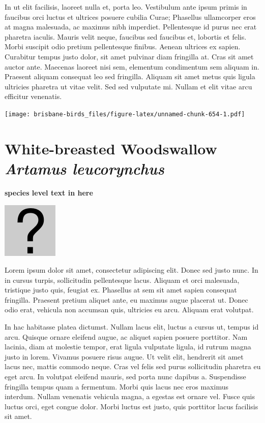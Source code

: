 \documentclass[]{book}
\let\origfigure\figure
\let\endorigfigure\endfigure
\renewenvironment{figure}[1][2] {
  \expandafter\origfigure\expandafter[H]
} {
  \endorigfigure
}
\begin{document}
In ut elit facilisis, laoreet nulla et, porta leo. Vestibulum ante ipsum
primis in faucibus orci luctus et ultrices posuere cubilia Curae;
Phasellus ullamcorper eros at magna malesuada, ac maximus nibh
imperdiet. Pellentesque id purus nec erat pharetra iaculis. Mauris velit
neque, faucibus sed faucibus et, lobortis et felis. Morbi suscipit odio
pretium pellentesque finibus. Aenean ultrices ex sapien. Curabitur
tempus justo dolor, sit amet pulvinar diam fringilla at. Cras sit amet
auctor ante. Maecenas laoreet nisi sem, elementum condimentum sem
aliquam in. Praesent aliquam consequat leo sed fringilla. Aliquam sit
amet metus quis ligula ultricies pharetra ut vitae velit. Sed sed
vulputate mi. Nullam et elit vitae arcu efficitur venenatis.

\begin{figure}
\centering
\texttt{[image: brisbane-birds\_files/figure-latex/unnamed-chunk-654-1.pdf]}
\caption{\label{fig:unnamed-chunk-654}insert figure caption}
\end{figure}

\section{\texorpdfstring{White-breasted Woodswallow \emph{Artamus
leucorynchus}}{White-breasted Woodswallow Artamus leucorynchus}}\label{white-breasted-woodswallow-artamus-leucorynchus}

\textbf{species level text in here}

\begin{figure}
\centering
\includegraphics{assets/missing.png}
\caption{No image for species}
\end{figure}

Lorem ipsum dolor sit amet, consectetur adipiscing elit. Donec sed justo
nunc. In in cursus turpis, sollicitudin pellentesque lacus. Aliquam et
orci malesuada, tristique justo quis, feugiat ex. Phasellus at sem sit
amet sapien consequat fringilla. Praesent pretium aliquet ante, eu
maximus augue placerat ut. Donec odio erat, vehicula non accumsan quis,
ultricies eu arcu. Aliquam erat volutpat.

In hac habitasse platea dictumst. Nullam lacus elit, luctus a cursus ut,
tempus id arcu. Quisque ornare eleifend augue, ac aliquet sapien posuere
porttitor. Nam lacinia, diam at molestie tempor, erat ligula vulputate
ligula, id rutrum magna justo in lorem. Vivamus posuere risus augue. Ut
velit elit, hendrerit sit amet lacus nec, mattis commodo neque. Cras vel
felis sed purus sollicitudin pharetra eu eget arcu. In volutpat eleifend
mauris, sed porta nunc dapibus a. Suspendisse fringilla tempus quam a
fermentum. Morbi quis lacus nec eros maximus interdum. Nullam venenatis
vehicula magna, a egestas est ornare vel. Fusce quis luctus orci, eget
congue dolor. Morbi luctus est justo, quis porttitor lacus facilisis sit
amet.
\end{document}
